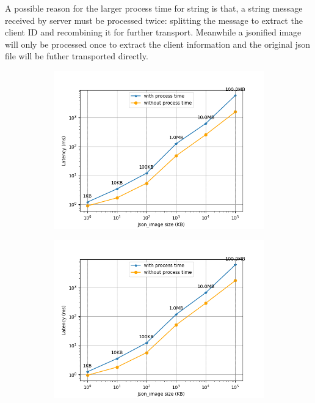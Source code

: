A possible reason for the larger process time for string is that, a string message 
received by server must be processed twice: splitting the message to extract the client 
ID and recombining it for further transport. Meanwhile a jsonified image will only be 
processed once to extract the client information and the original json file will be 
futher transported directly.     
\begin{figure}[htb]
        \centering
    \begin{subfigure}{0.49\textwidth}
        \includegraphics[width=\textwidth]{figures/tests/proportional_tests/log_Average_json_image_messages_sending_time_of_100_tests_1KB_to_100MB.png}\hfill 
        \caption{} \label{fig: proportional-imagesize-c}
    \end{subfigure}
    \begin{subfigure}{0.49\textwidth}
        \centering
        \includegraphics[width=\textwidth]{figures/tests/proportional_tests/log_Average_json_image_messages_receiving_time_of_100_tests_1KB_to_100MB.png}\hfill 

\end{subfigure}
\end{figure}
